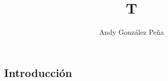 \documentclass{llncs}
\begin{document}
\title{T}

\author{Andy Gonz\'alez Pe\~na}

\maketitle

\begin{abstract}



\end{abstract}

\begin{keywords}

\end{keywords}

\begin{multicols}{2}[]


\section{Introducci\'on}\label{sec:Introduction}

\end{multicols}



\end{document}
